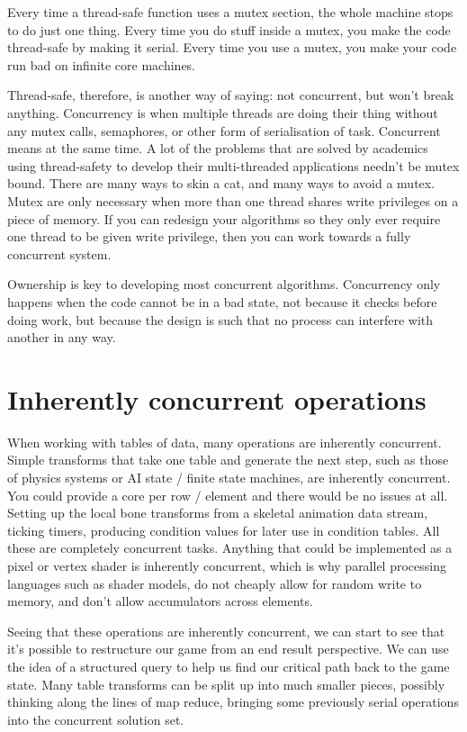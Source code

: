 Every time a thread-safe function uses a mutex section, the whole machine stops
to do just one thing. Every time you do stuff inside a mutex, you make the code
thread-safe by making it serial. Every time you use a mutex, you make your code
run bad on infinite core machines.

Thread-safe, therefore, is another way of saying: not concurrent, but won't
break anything.  Concurrency is when multiple threads are doing their thing
without any mutex calls, semaphores, or other form of serialisation of task.
Concurrent means at the same time. A lot of the problems that are solved by
academics using thread-safety to develop their multi-threaded applications
needn't be mutex bound. There are many ways to skin a cat, and many ways to
avoid a mutex. Mutex are only necessary when more than one thread shares write
privileges on a piece of memory. If you can redesign your algorithms so they
only ever require one thread to be given write privilege, then you can work
towards a fully concurrent system.

Ownership is key to developing most concurrent algorithms. Concurrency only
happens when the code cannot be in a bad state, not because it checks before
doing work, but because the design is such that no process can interfere with
another in any way.

\section{Inherently concurrent operations}

When working with tables of data, many operations are inherently concurrent.
Simple transforms that take one table and generate the next step, such as those
of physics systems or AI state / finite state machines, are inherently
concurrent. You could provide a core per row / element and there would be no
issues at all. Setting up the local bone transforms from a skeletal animation
data stream, ticking timers, producing condition values for later use in
condition tables. All these are completely concurrent tasks. Anything that
could be implemented as a pixel or vertex shader is inherently concurrent,
which is why parallel processing languages such as shader models, do not
cheaply allow for random write to memory, and don't allow accumulators across
elements.

Seeing that these operations are inherently concurrent, we can start to see
that it's possible to restructure our game from an end result perspective. We
can use the idea of a structured query to help us find our critical path back
to the game state. Many table transforms can be split up into much smaller
pieces, possibly thinking along the lines of map reduce, bringing some
previously serial operations into the concurrent solution set.

